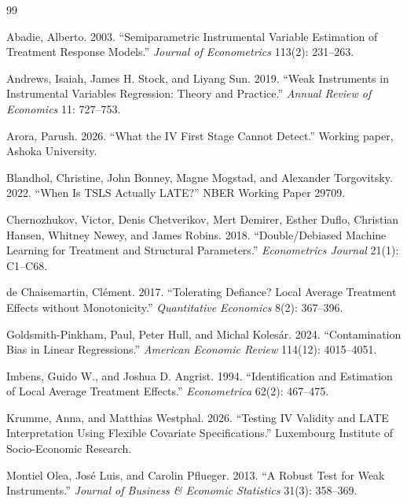 \documentclass[11pt]{article}
\theoremstyle{plain}
\theoremstyle{definition}
\begin{document}
\clearpage

\begin{thebibliography}{99}

 Abadie, Alberto. 2003. ``Semiparametric Instrumental Variable Estimation of Treatment Response Models.'' \textit{Journal of Econometrics} 113(2): 231--263.

 Andrews, Isaiah, James H. Stock, and Liyang Sun. 2019. ``Weak Instruments in Instrumental Variables Regression: Theory and Practice.'' \textit{Annual Review of Economics} 11: 727--753.

 Arora, Parush. 2026. ``What the IV First Stage Cannot Detect.'' Working paper, Ashoka University.

 Blandhol, Christine, John Bonney, Magne Mogstad, and Alexander Torgovitsky. 2022. ``When Is TSLS Actually LATE?'' NBER Working Paper 29709.

 Chernozhukov, Victor, Denis Chetverikov, Mert Demirer, Esther Duflo, Christian Hansen, Whitney Newey, and James Robins. 2018. ``Double/Debiased Machine Learning for Treatment and Structural Parameters.'' \textit{Econometrics Journal} 21(1): C1--C68.

 de Chaisemartin, Cl\'ement. 2017. ``Tolerating Defiance? Local Average Treatment Effects without Monotonicity.'' \textit{Quantitative Economics} 8(2): 367--396.

 Goldsmith-Pinkham, Paul, Peter Hull, and Michal Koles\'ar. 2024. ``Contamination Bias in Linear Regressions.'' \textit{American Economic Review} 114(12): 4015--4051.

 Imbens, Guido W., and Joshua D. Angrist. 1994. ``Identification and Estimation of Local Average Treatment Effects.'' \textit{Econometrica} 62(2): 467--475.

 Krumme, Anna, and Matthias Westphal. 2026. ``Testing IV Validity and LATE Interpretation Using Flexible Covariate Specifications.'' Luxembourg Institute of Socio-Economic Research.

 Montiel Olea, Jos\'e Luis, and Carolin Pflueger. 2013. ``A Robust Test for Weak Instruments.'' \textit{Journal of Business \& Economic Statistics} 31(3): 358--369.


\end{thebibliography}
\end{document}
